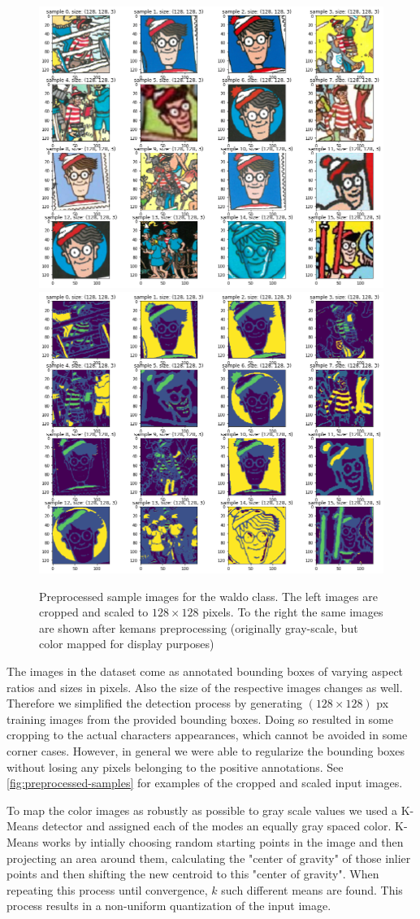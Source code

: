 \documentclass[11pt]{article}
\begin{document}
\begin{figure}[]
    \centering
    \includegraphics[width=0.4\linewidth]{figures/preprocess_waldo} 
    \hspace{1cm}
    \includegraphics[width=0.4\linewidth]{figures/kmeans_waldo} 
    \caption{Preprocessed sample images for the waldo class. The left images are cropped and scaled to \( 128 \times 128 \) pixels.
    To the right the same images are shown after kemans preprocessing (originally gray-scale, but color mapped for display purposes)}
    \label{fig:preprocessed-samples}
\end{figure}

The images in the dataset come as annotated bounding boxes of varying aspect ratios and sizes in pixels.
Also the size of the respective images changes as well. Therefore we simplified the detection process by
generating \( (128 \times 128) \) px training images from the provided bounding boxes. 
Doing so resulted in some cropping to the actual characters appearances, which cannot be avoided in some corner cases.
However, in general we were able to regularize the bounding boxes without losing any pixels belonging to the positive annotations.
See \autoref{fig:preprocessed-samples} for examples of the cropped and scaled input images.

To map the color images as robustly as possible to gray scale values we used a K-Means detector 
and assigned each of the modes an equally gray spaced color. 
K-Means works by intially choosing random starting points in the image and then projecting an area around them, calculating the "center of gravity"
of those inlier points and then shifting the new centroid to this "center of gravity". When repeating this
process until convergence, \( k \) such different means are found. This process results in a non-uniform quantization of the input image.
\end{document}
